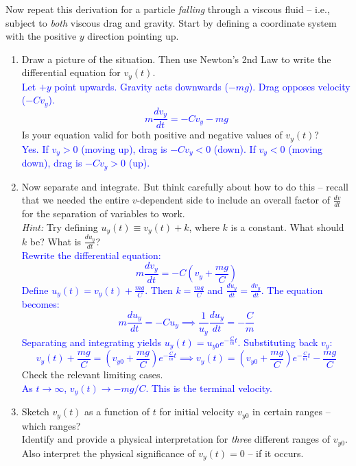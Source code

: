\documentclass[11pt, letterpaper, openany]{book}
\newenvironment{exercise}[1][Exercise]{%
  \tcolorbox[blanker, breakable, left=1em,
    before skip=1em, after skip=1em,
    borderline west={3pt}{0pt}{PhysNavy},
    colback=PhysCream,
    before upper={\textcolor{PhysNavy}{\sffamily\bfseries #1:}\space}
  ]%
}{%
  \endtcolorbox%
}
\begin{document}
\begin{exercise}[Exercise 2]
Now repeat this derivation for a particle \textit{falling} through a viscous fluid -- i.e., subject to \textit{both} viscous drag and gravity. Start by defining a coordinate system with the positive $y$ direction pointing up.
\begin{enumerate}[label=(\alph*)]
    \item Draw a picture of the situation. Then use Newton's 2nd Law to write the differential equation for $v_y(t)$. \\
    \textcolor{blue}{
    Let $+y$ point upwards. Gravity acts downwards ($-mg$). Drag opposes velocity ($-C v_y$).
    \[ m\frac{dv_y}{dt} = -Cv_y - mg \label{eq:drag_grav} \tag{5} \]
    }
    Is your equation valid for both positive and negative values of $v_y(t)$? \\
    \textcolor{blue}{Yes. If $v_y > 0$ (moving up), drag is $-Cv_y < 0$ (down). If $v_y < 0$ (moving down), drag is $-Cv_y > 0$ (up).}
    
    \item Now separate and integrate. But think carefully about how to do this -- recall that we needed the entire $v$-dependent side to include an overall factor of $\frac{dv}{dt}$ for the separation of variables to work. \\
    \textit{Hint:} Try defining $u_y(t) \equiv v_y(t) + k$, where $k$ is a constant. What should $k$ be? What is $\frac{du_y}{dt}$? \\
    \textcolor{blue}{
    Rewrite the differential equation:
    \[ m\frac{dv_y}{dt} = -C\left(v_y + \frac{mg}{C}\right) \]
    Define $u_y(t) = v_y(t) + \frac{mg}{C}$. Then $k = \frac{mg}{C}$ and $\frac{du_y}{dt} = \frac{dv_y}{dt}$.
    The equation becomes:
    \[ m\frac{du_y}{dt} = -Cu_y \implies \frac{1}{u_y}\frac{du_y}{dt} = -\frac{C}{m} \]
    Separating and integrating yields $u_y(t) = u_{y0} e^{-\frac{C}{m}t}$.
    Substituting back $v_y$:
    \[ v_y(t) + \frac{mg}{C} = \left(v_{y0} + \frac{mg}{C}\right)e^{-\frac{C}{m}t} \implies v_y(t) = \left(v_{y0} + \frac{mg}{C}\right)e^{-\frac{C}{m}t} - \frac{mg}{C} \]
    }
    Check the relevant limiting cases. \\
    \textcolor{blue}{As $t \to \infty$, $v_y(t) \to -mg/C$. This is the terminal velocity.}
    
    \item Sketch $v_y(t)$ as a function of $t$ for initial velocity $v_{y0}$ in certain ranges -- which ranges? \\
    Identify and provide a physical interpretation for \textit{three} different ranges of $v_{y0}$. \\
    Also interpret the physical significance of $v_y(t) = 0$ -- if it occurs.
    

\end{enumerate}
\end{exercise}
\end{document}
